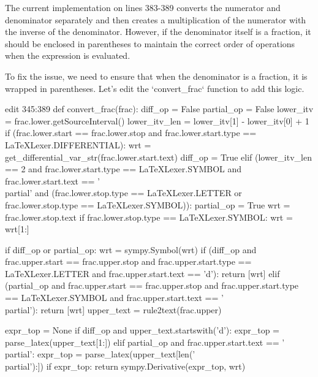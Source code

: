 {\begin{agentbox}
The current implementation on lines 383-389 converts the numerator and denominator separately and then creates a multiplication of the numerator with the inverse of the denominator. However, if the denominator itself is a fraction, it should be enclosed in parentheses to maintain the correct order of operations when the expression is evaluated.



To fix the issue, we need to ensure that when the denominator is a fraction, it is wrapped in parentheses. Let's edit the `convert\_frac` function to add this logic.

\hrulefill
\begin{CodeVerbatim}[breaklines=true, breakanywhere=true]
edit 345:389
def convert_frac(frac):
    diff_op = False
    partial_op = False
    lower_itv = frac.lower.getSourceInterval()
    lower_itv_len = lower_itv[1] - lower_itv[0] + 1
    if (frac.lower.start == frac.lower.stop
            and frac.lower.start.type == LaTeXLexer.DIFFERENTIAL):
        wrt = get_differential_var_str(frac.lower.start.text)
        diff_op = True
    elif (lower_itv_len == 2 and frac.lower.start.type == LaTeXLexer.SYMBOL
          and frac.lower.start.text == '\\partial'
          and (frac.lower.stop.type == LaTeXLexer.LETTER
               or frac.lower.stop.type == LaTeXLexer.SYMBOL)):
        partial_op = True
        wrt = frac.lower.stop.text
        if frac.lower.stop.type == LaTeXLexer.SYMBOL:
            wrt = wrt[1:]

    if diff_op or partial_op:
        wrt = sympy.Symbol(wrt)
        if (diff_op and frac.upper.start == frac.upper.stop
                and frac.upper.start.type == LaTeXLexer.LETTER
                and frac.upper.start.text == 'd'):
            return [wrt]
        elif (partial_op and frac.upper.start == frac.upper.stop
              and frac.upper.start.type == LaTeXLexer.SYMBOL
              and frac.upper.start.text == '\\partial'):
            return [wrt]
        upper_text = rule2text(frac.upper)

        expr_top = None
        if diff_op and upper_text.startswith('d'):
            expr_top = parse_latex(upper_text[1:])
        elif partial_op and frac.upper.start.text == '\\partial':
            expr_top = parse_latex(upper_text[len('\\partial'):])
        if expr_top:
            return sympy.Derivative(expr_top, wrt)


\end{CodeVerbatim}
\end{agentbox}}
